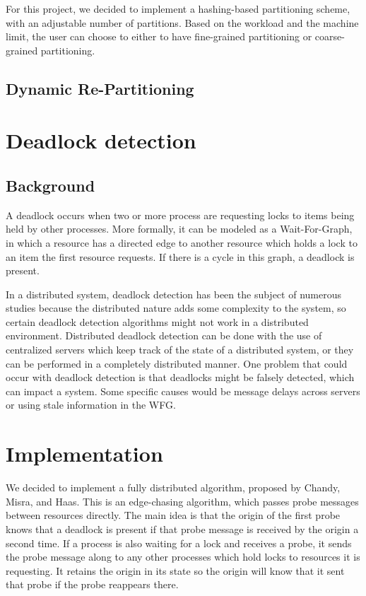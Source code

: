 \documentclass[a4paper, 10pt, notitlepage]{report}
\begin{document}
For this project, we decided to implement a hashing-based partitioning scheme, with an adjustable number of partitions.
Based on the workload and the machine limit, the user can choose to either to have fine-grained partitioning or
coarse-grained partitioning.

\subsection*{Dynamic Re-Partitioning}

\section*{Deadlock detection}
\subsection*{Background}
A deadlock occurs when two or more process are requesting locks to items being held by other processes. More formally, it can be modeled as a Wait-For-Graph, in which a resource has a directed edge to another resource which holds a lock to an item the first resource requests. If there is a cycle in this graph, a deadlock is present.

In a distributed system, deadlock detection has been the subject of numerous studies because the distributed nature adds some complexity to the system, so certain deadlock detection algorithms might not work in a distributed environment. Distributed deadlock detection can be done with the use of centralized servers which keep track of the state of a distributed system, or they can be performed in a completely distributed manner. One problem that could occur with deadlock detection is that deadlocks might be falsely detected, which can impact a system. Some specific causes would be message delays across servers or using stale information in the WFG.

\section*{Implementation}
We decided to implement a fully distributed algorithm, proposed by Chandy, Misra, and Haas. This is an edge-chasing algorithm, which passes probe messages between resources directly. The main idea is that the origin of the first probe knows that a deadlock is present if that probe message is received by the origin a second time. If a process is also waiting for a lock and receives a probe, it sends the probe message along to any other processes which hold locks to resources it is requesting. It retains the origin in its state so the origin will know that it sent that probe if the probe reappears there.
\end{document}
